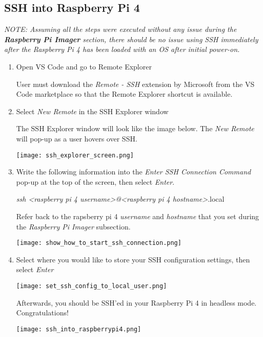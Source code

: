 \documentclass[journal]{IEEEtran}
\begin{document}
    \subsection{SSH into Raspberry Pi 4}

    \emph{NOTE: Assuming all the steps were executed without any issue during the \textbf{Raspberry Pi Imager} section, there should be no issue using SSH immediately after the Raspberry Pi 4 has been loaded with an OS after initial power-on.} \newline

    \begin{enumerate}
        \item Open VS Code and go to Remote Explorer \newline
        
        User must download the \emph{Remote - SSH} extension by Microsoft from the VS Code marketplace so that the Remote Explorer shortcut is available. \newline

        \item Select \emph{New Remote} in the SSH Explorer window \newline
        
        The SSH Explorer window will look like the image below. The \emph{New Remote} will pop-up as a user hovers over SSH. \newline

        \texttt{[image: ssh\_explorer\_screen.png]}

        \item Write the following information into the \emph{Enter SSH Connection Command} pop-up at the top of the screen, then select \emph{Enter}. \newline
        
        \emph{ssh <raspberry pi 4 username>@<raspberry pi 4 hostname>}.local \newline

        Refer back to the rapsberry pi 4 \emph{username} and \emph{hostname} that you set during the \emph{Raspberry Pi Imager} subsection. \newline

        \texttt{[image: show\_how\_to\_start\_ssh\_connection.png]}

        \item Select where you would like to store your SSH configuration settings, then select \emph{Enter}
        
        \texttt{[image: set\_ssh\_config\_to\_local\_user.png]}

        Afterwards, you should be SSH'ed in your Raspberry Pi 4 in headless mode. Congratulations! \newline
        
        \texttt{[image: ssh\_into\_raspberrypi4.png]}

    \end{enumerate}
\end{document}
